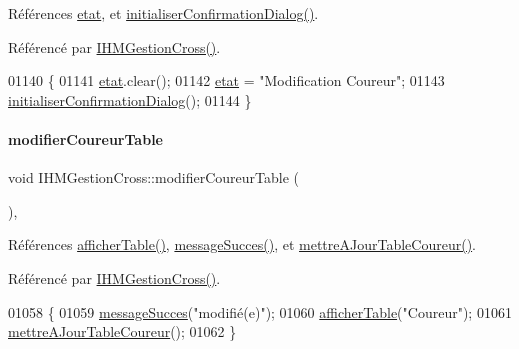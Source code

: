 Références \hyperlink{class_i_h_m_gestion_cross_a5da4390d71dbd5d05cff339f93c7c85a}{etat}, et \hyperlink{class_i_h_m_gestion_cross_a1d3c7f83d4c960f38b237499d2a89731}{initialiser\+Confirmation\+Dialog()}.



Référencé par \hyperlink{class_i_h_m_gestion_cross_a2c62fd83326a87456a403f46acc408c8}{I\+H\+M\+Gestion\+Cross()}.


\begin{DoxyCode}
01140 \{
01141     \hyperlink{class_i_h_m_gestion_cross_a5da4390d71dbd5d05cff339f93c7c85a}{etat}.clear();
01142     \hyperlink{class_i_h_m_gestion_cross_a5da4390d71dbd5d05cff339f93c7c85a}{etat} = \textcolor{stringliteral}{"Modification Coureur"};
01143     \hyperlink{class_i_h_m_gestion_cross_a1d3c7f83d4c960f38b237499d2a89731}{initialiserConfirmationDialog}();
01144 \}
\end{DoxyCode}
\mbox{\label{class_i_h_m_gestion_cross_a3a969f85f31f25ed6df6a75a1cee2de1}} 
\paragraph{\texorpdfstring{modifier\+Coureur\+Table}{modifierCoureurTable}}
{\footnotesize\ttfamily void I\+H\+M\+Gestion\+Cross\+::modifier\+Coureur\+Table (\begin{DoxyParamCaption}{ }\end{DoxyParamCaption})\hspace{0.3cm}{\ttfamily [private]}, {\ttfamily [slot]}}



Références \hyperlink{class_i_h_m_gestion_cross_ae1510779a1efa3defecb517467e84f91}{afficher\+Table()}, \hyperlink{class_i_h_m_gestion_cross_a71412d0c3e1d059a646c755803077a7b}{message\+Succes()}, et \hyperlink{class_i_h_m_gestion_cross_a53c84315d723d75ad7b4a7d4c317efc5}{mettre\+A\+Jour\+Table\+Coureur()}.



Référencé par \hyperlink{class_i_h_m_gestion_cross_a2c62fd83326a87456a403f46acc408c8}{I\+H\+M\+Gestion\+Cross()}.


\begin{DoxyCode}
01058 \{
01059     \hyperlink{class_i_h_m_gestion_cross_a71412d0c3e1d059a646c755803077a7b}{messageSucces}(\textcolor{stringliteral}{"modifié(e)"});
01060     \hyperlink{class_i_h_m_gestion_cross_ae1510779a1efa3defecb517467e84f91}{afficherTable}(\textcolor{stringliteral}{"Coureur"});
01061     \hyperlink{class_i_h_m_gestion_cross_a53c84315d723d75ad7b4a7d4c317efc5}{mettreAJourTableCoureur}();
01062 \}
\end{DoxyCode}
\mbox{\label{class_i_h_m_gestion_cross_ac8f336c95a5f0c9eb8a4bc1c4bb83445}} 
